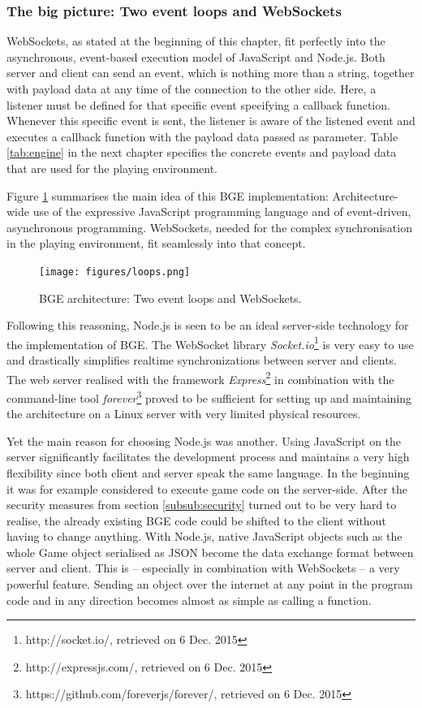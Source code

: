 \subsubsection{The big picture: Two event loops and WebSockets}
\label{sub:sub:bigpicture}

WebSockets, as stated at the beginning of this chapter, fit perfectly into the asynchronous, event-based execution model of JavaScript and Node.js. Both server and client can send an event, which is nothing more than a string, together with payload data at any time of the connection to the other side. Here, a listener must be defined for that specific event specifying a callback function. Whenever this specific event is sent, the listener is aware of the listened event and executes a callback function with the payload data passed as parameter. 
Table \ref{tab:engine} in the next chapter specifies the concrete events and payload data that are used for the playing environment.

Figure \ref{fig:loops} summarises the main idea of this BGE implementation: Architecture-wide use of the expressive JavaScript programming language and of event-driven, asynchronous programming. WebSockets, needed for the complex synchronisation in the playing environment, fit seamlessly into that concept. 

\begin{figure}[ht]
	\centering
	\texttt{[image: figures/loops.png]}
	\caption{BGE architecture: Two event loops and WebSockets.}
	\label{fig:loops}
\end{figure}

Following this reasoning, Node.js is seen to be an ideal server-side technology for the implementation of BGE. The WebSocket library \textit{Socket.io}\footnote{http://socket.io/, retrieved on 6 Dec. 2015} is very easy to use and drastically simplifies realtime synchronizations between server and clients. The web server realised with the framework \textit{Express}\footnote{http://expressjs.com/, retrieved on 6 Dec. 2015} in combination with the command-line tool \textit{forever}\footnote{https://github.com/foreverjs/forever/, retrieved on 6 Dec. 2015} proved to be sufficient for setting up and maintaining the architecture on a Linux server with very limited physical resources.

Yet the main reason for choosing Node.js was another. Using JavaScript on the server significantly facilitates the development process and maintains a very high flexibility since both client and server speak the same language. In the beginning it was for example considered to execute game code on the server-side. After the security measures from section \ref{subsub:security} turned out to be very hard to realise, the already existing BGE code could be shifted to the client without having to change anything. With Node.js, native JavaScript objects such as the whole Game object serialised as JSON become the data exchange format between server and client. This is -- especially in combination with WebSockets -- a very powerful feature. Sending an object over the internet at any point in the program code and in any direction becomes almost as simple as calling a function.

